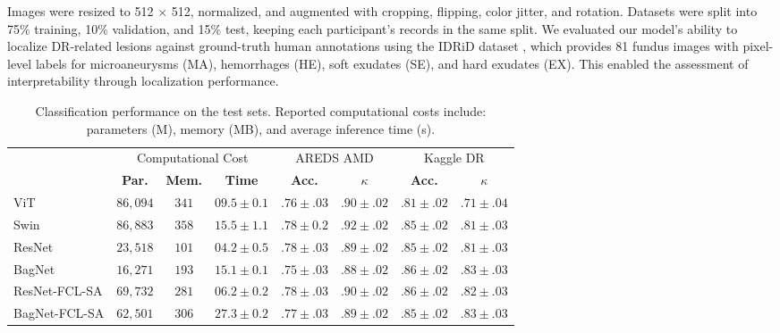 \documentclass[runningheads]{llncs}
\begin{document}
        Images were resized to 512 × 512, normalized, and augmented with cropping, flipping, color jitter, and rotation. Datasets were split into 75\% training, 10\% validation, and 15\% test, keeping each participant’s records in the same split.
        We evaluated our model’s ability to localize DR-related lesions against ground-truth human annotations using the IDRiD dataset \cite{porwal2018indian}, which provides 81 fundus images with pixel-level labels for microaneurysms (MA), hemorrhages (HE), soft exudates (SE), and hard exudates (EX). This enabled the assessment of interpretability through localization performance.

        \begin{table}[b]
            \centering
            \caption{Classification performance on the test sets. Reported computational costs include: parameters (M), memory (MB), and average inference time (s). }
            \label{tab1}
            \begin{tabular}{l |c c c| c c | c c}
                \hline
                & \multicolumn{3}{c|}{Computational Cost} & \multicolumn{2}{c|}{AREDS AMD} & \multicolumn{2}{c}{Kaggle DR} \\
                 & \textbf{Par.} & \textbf{Mem.} & \textbf{Time} & \textbf{Acc.} & \textbf{$\kappa$} &  \textbf{Acc.} & \textbf{$\kappa$}  \\
                \hline
                ViT \cite{dosovitskiy2020image} & $86,094$ & $341$ & $09.5 \pm 0.1$ & $.76 \pm .03$ & $.90 \pm .02$ & $.81 \pm .02$ & $.71 \pm .04$ \\
                Swin \cite{liu2021swin} & $86,883$ & $358$ & $15.5 \pm 1.1$ & $.78 \pm 0.2$ & $\mathbf{.92 \pm .02}$ & $.85 \pm .02$ & $.81 \pm .03$ \\
                ResNet \cite{he2016deep} & $23,518$ & $101$ & $04.2 \pm 0.5$ & $.78 \pm .03$ & $.89 \pm .02$ & $.85 \pm .02$ & $.81 \pm .03$ \\
                BagNet \cite{donteu2023sparse} & $16,271$ & $193$ & $15.1 \pm 0.1$ & $.75 \pm .03$ & $.88 \pm .02$ & $.86 \pm .02$ & $.83 \pm.03$ \\
                \hline
                ResNet-FCL-SA & $69,732$ & $281$ & $06.2 \pm 0.2$ & $.78 \pm .03$ & $.90 \pm .02$ & $.86 \pm .02$ & $.82 \pm .03$ \\
                BagNet-FCL-SA & $62,501$ & $306$ & $27.3 \pm 0.2$ & $.77 \pm .03$ & $.89 \pm .02$ & $.85 \pm .02$ & $.83 \pm .03$ \\
                \hline

\end{tabular}
\end{table}
\end{document}

